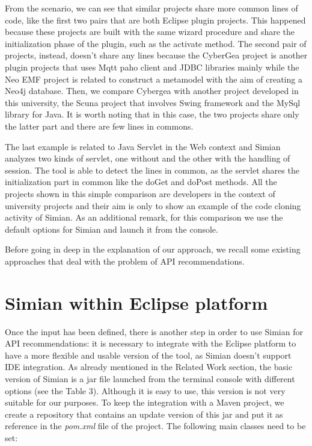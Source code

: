 From the scenario, we can see that similar projects share more common lines of code, like the first two pairs that are both Eclipse plugin projects. This happened because these projects are built with the same wizard procedure and share the initialization phase of the plugin, such as the activate method. The second pair of projects, instead, doesn't share any lines because the CyberGea project is another plugin projects that uses Mqtt paho client and JDBC libraries mainly while the Neo EMF project is related to construct a metamodel with the aim of creating a Neo4j database. Then, we compare Cybergea with another project developed in this university, the Scuna project that involves Swing framework and the MySql library for Java. It is worth noting that in this case, the two projects
share only the latter part and there are few lines in commons. 

The last example is related to Java Servlet in the Web context and Simian analyzes two kinds of servlet, one without and the other with the handling of session. The tool is able to detect the lines in common, as the servlet shares the initialization part in common like the doGet and doPost methods. All the projects shown in this simple comparison are developers in the context of university projects and their aim is only to show an example of the code cloning activity of Simian. As an additional remark, for this comparison we use the default options for Simian and launch it from the console.%
 
Before going in deep in the explanation of our approach, we recall some existing approaches that deal with the problem of API recommendations.%


\section{Simian within Eclipse platform}

Once the input has been defined, there is another step in order to use Simian for API recommendations: it is necessary to integrate with the Eclipse platform to have a more flexible and usable version of the tool, as Simian doesn't support IDE integration. As already mentioned in the Related Work section, the basic version of Simian is a jar file launched from the terminal console with different options (see the Table 3). Although it is easy to use, this version is not very suitable for our purposes. To keep the integration with a Maven project, we create a repository that contains an update version of this jar and put it as reference in the \emph{pom.xml} file of the project. The following main classes need to be set: 

